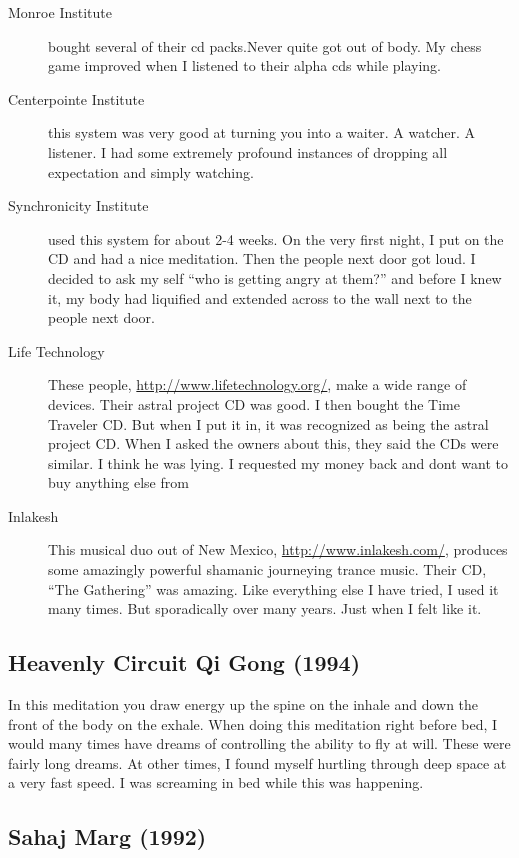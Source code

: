 \documentclass[12pt]{article}%
\begin{document}
\begin{description}
	\item[Monroe Institute] bought several of their cd packs.Never quite got out of body. My chess game improved when I listened to their alpha cds while playing.
	\item[Centerpointe Institute] this system was very good at turning you into a waiter. A watcher. A listener. I had some extremely profound instances of dropping all expectation and simply watching.
	\item[Synchronicity Institute] used this system for about 2-4 weeks. On the very first night, I put on the CD and had a nice meditation. Then the people next door got loud. I decided to ask my self ``who is getting angry at them?'' and before I knew it, my body had liquified and extended across to the wall next to the people next door.
	\item[Life Technology] These people, \url{http://www.lifetechnology.org/}, make a wide range of devices. Their astral project CD was good. I then bought the Time Traveler CD. But when I put it in, it was recognized as being the astral project CD. When I asked the owners about this, they said the CDs were similar. I think he was lying. I requested my money back and dont want to buy anything else from
	\item[Inlakesh] This musical duo out of New Mexico, \url{http://www.inlakesh.com/}, produces some amazingly powerful shamanic journeying trance music. Their CD, ``The Gathering'' was amazing. Like everything else I have tried, I used it many times. But sporadically over many years. Just when I felt like it.
\end{description}

\subsection{Heavenly Circuit Qi Gong (1994)}

In this meditation you draw energy up the spine on the inhale and down the front of the body on the exhale. When doing this meditation right before bed, I would many times have dreams of controlling the ability to fly at will. These were fairly long dreams. At other times, I found myself hurtling through deep space at a very fast speed. I was screaming in bed while this was happening.

\subsection{Sahaj Marg (1992)}
\end{document}
